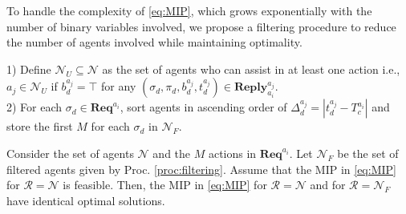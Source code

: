 To handle the complexity of \eqref{eq:MIP}, which grows exponentially with the number of binary variables involved, we propose a filtering procedure to reduce the number of agents involved while maintaining optimality.
\begin{procedure2}\label{proc:filtering}
    1) Define $\mathcal{N}_U\subseteq\mathcal{N}$ as the set of agents who can assist in at least one action i.e., $a_j \in \mathcal{N}_U$ if $b^{a_j}_d = \top$ for any $(\sigma_d, \pi_d, b^{a_j}_d, t^{a_j}_d) \in \mathbf{Reply}^{a_j}_{a_i}$.\\
    2) For each $\sigma_d \in \mathbf{Req}^{a_i}$, sort agents in ascending order of $\Delta^{a_j}_{d} = |t^{a_j}_d - T_c^{a_i}|$ and store the first $M$ for each $\sigma_d$ in $\mathcal{N}_F$.
\end{procedure2}
\begin{theorem}\label{thm:MIP}
    Consider the set of agents $\mathcal{N}$ and the $M$ actions in $\mathbf{Req}^{a_i}$. Let $\mathcal{N}_F$ be the set of filtered agents given by Proc. \ref{proc:filtering}. Assume that the MIP in \eqref{eq:MIP} for $\mathcal{R}=\mathcal{N}$ is feasible. Then, the MIP in \eqref{eq:MIP} for $\mathcal{R}=\mathcal{N}$ and for $\mathcal{R}=\mathcal{N}_F$ have identical optimal solutions.
\end{theorem}
\begin{comment}
        \textbf{Feasibility}: We will show that $\mathcal{N}_F$ includes a feasible solution if $\mathcal{N}$ contains one. Let $\mathcal{N}_H \subseteq \mathcal{N}_F$ with $|\mathcal{N}_H|\geq M$. Note that by Proc. \ref{proc:filtering}, $\mathcal{N}_U$ contains agents who can assist in at least one action, ensuring each agent in $\mathcal{N}_F$ can help with at least one action. To construct $\mathcal{N}_H$, consider sets $\mathcal{N}_d$ ($d \in \{1,\ldots,M\}$), where $a_j \in \mathcal{N}_d$ if $b^{a_j}_{d}=\top$ and denote their cardinality by $|\mathcal{N}_d|=M_d$, w.l.o.g assume $M_1 \leq M_2 \leq \ldots \leq M_M$. Order agents in ascending order of $\Delta^{a_j}_d$ for all $\mathcal{N}_d$. Starting with $\mathcal{N}_{1}$, select the first agent $a_p$, assign it to $\sigma_1$, and add it to $\mathcal{N}_H$. For $\mathcal{N}_{2}$, find the first agent different from $a_p$, say $a_q$, assign it to $\sigma_2$, and add it to $\mathcal{N}_H$. Since $M_2 \geq 2$, $a_q \neq a_p$. Continue until $\mathcal{N}_M$, where $a_r$ is selected and assigned to $\sigma_M$, completing $\mathcal{N}_H$. This construction ensures that $\mathcal{N}_H \subseteq \mathcal{N}_F$ meets the properties in Rmk \ref{rmk:feasibility_MIP}, maintaining feasibility.\\ \textbf{Optimality}: 
\end{comment}
